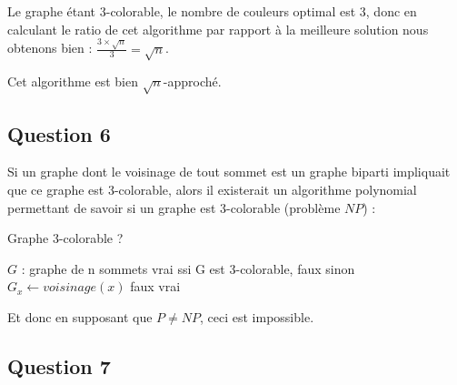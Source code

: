 Le graphe \'etant 3-colorable, le nombre de couleurs optimal est 3, donc en calculant le
ratio de cet algorithme par rapport \`a la meilleure solution nous obtenons bien :
$\frac{3 \times \sqrt{n}}{3} = \sqrt{n}$.

Cet algorithme est bien $\sqrt{n}$-approch\'e.

\subsection{Question 6}\label{ex16_q6}
Si un graphe dont le voisinage de tout sommet est un graphe biparti impliquait que ce
graphe est 3-colorable, alors il existerait un algorithme polynomial permettant de
savoir si un graphe est 3-colorable (probl\`eme $NP$) :

\begin{center}
\begin{algorithm}[H]
\caption{Graphe 3-colorable ?}\label{ex16_algo2}
\begin{algorithmic}[1]
\REQUIRE $G$ : graphe de n sommets
\ENSURE vrai ssi G est 3-colorable, faux sinon  
		\STATE $G_x \leftarrow voisinage(x)$
			\RETURN faux
		\ENDIF
	\ENDFOR
	\RETURN vrai
\end{algorithmic}
\end{algorithm}
\end{center}

Et donc en supposant que $P \neq NP$, ceci est impossible.

\subsection{Question 7}\label{ex16_q7}

